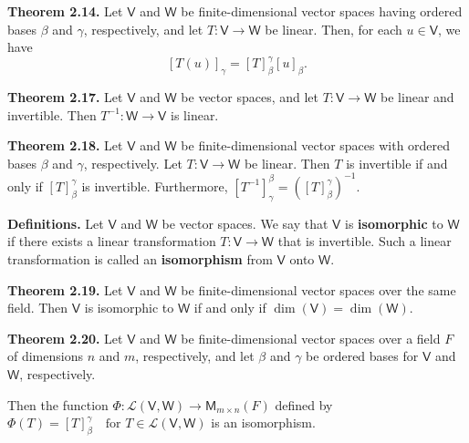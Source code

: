 \documentclass{article}
\newcommand{\0}{\mathit{0}}
\begin{document}
\medskip

\textbf{Theorem 2.14.} Let $\mathsf{V}$ and $\mathsf{W}$ be finite-dimensional vector spaces 
having ordered bases $\beta$ and $\gamma$, respectively, and let 
$T: \mathsf{V} \to \mathsf{W}$ be linear. 
Then, for each $u \in \mathsf{V}$, we have
\[
\left[ T(u) \right]_\gamma = \left[ T \right]^\gamma_\beta \left[ u \right]_\beta.
\]

\medskip

\textbf{Theorem 2.17.} Let $\mathsf{V}$ and $\mathsf{W}$ be vector spaces, and let
$T: \mathsf{V} \to \mathsf{W}$ be linear and invertible.
Then $T^{-1}: \mathsf{W} \to \mathsf{V}$ is linear.

\medskip

\textbf{Theorem 2.18.} Let $\mathsf{V}$ and $\mathsf{W}$ be finite-dimensional vector spaces
with ordered bases $\beta$ and $\gamma$, respectively. Let
$T: \mathsf{V} \to \mathsf{W}$ be linear.
Then $T$ is invertible if and only if $\left[ T \right]^\gamma_\beta$ is invertible.
Furthermore,
\(
\left[ T^{-1} \right]^\beta_\gamma = \left( \left[ T \right]^\gamma_\beta \right)^{-1}.
\)

\medskip

\textbf{Definitions.} Let $\mathsf{V}$ and $\mathsf{W}$ be vector spaces. 
We say that $\mathsf{V}$ is \textbf{isomorphic} to $\mathsf{W}$ if there exists a linear transformation 
$T: \mathsf{V} \to \mathsf{W}$ that is invertible. Such a linear transformation is called an 
\textbf{isomorphism} from $\mathsf{V}$ onto $\mathsf{W}$.

\medskip

\textbf{Theorem 2.19.} Let $\mathsf{V}$ and $\mathsf{W}$ be finite-dimensional vector spaces 
over the same field. Then $\mathsf{V}$ is isomorphic to $\mathsf{W}$ if and only if 
\(
\dim(\mathsf{V}) = \dim(\mathsf{W}).
\)

\medskip

\textbf{Theorem 2.20.} Let $\mathsf{V}$ and $\mathsf{W}$ be finite-dimensional vector spaces 
over a field $F$ of dimensions $n$ and $m$, respectively, and let $\beta$ and $\gamma$ 
be ordered bases for $\mathsf{V}$ and $\mathsf{W}$, respectively. 

Then the function 
\(
\Phi: \mathcal{L}(\mathsf{V}, \mathsf{W}) \to \mathsf{M}_{m \times n}(F)
\)
defined by
\(
\Phi(T) = \left[ T \right]^\gamma_\beta \quad \text{for } T \in \mathcal{L}(\mathsf{V}, \mathsf{W})
\)
is an isomorphism.
\end{document}
